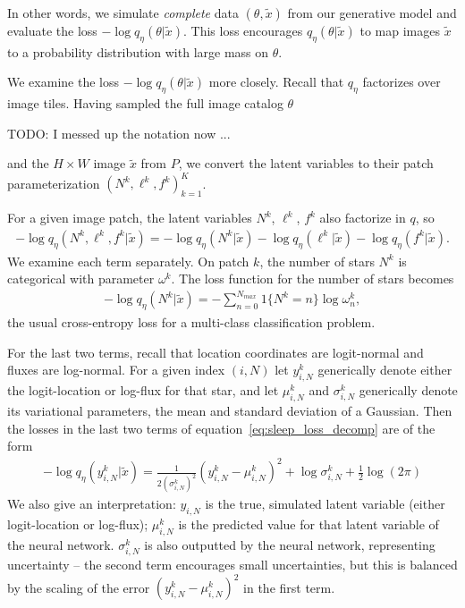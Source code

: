 In other words, we simulate {\itshape complete} data $(\theta, \tilde x)$ from our generative model and evaluate the loss $-\log q_\eta(\theta | \tilde x)$. 
This loss encourages $q_{\eta}(\theta | \tilde x)$ to map images $\tilde x$ to a probability distribution with large mass on $\theta$.

We examine the loss $-\log q_\eta(\theta | \tilde x)$ more closely. Recall that $q_\eta$ factorizes over image tiles. Having sampled the full image catalog $\theta$ 

TODO: I messed up the notation now ... 

and the $H\times W$ image $\tilde x$ from $P$, we convert the latent variables to their patch parameterization $(N^k, \ell^k, f^k)_{k = 1}^K$. 

For a given image patch, the latent variables $N^k$, $\ell^k$, $f^k$ also factorize in $q$, so 
\begin{align}
    - \log q_\eta(N^k, \ell^k, f^k | \tilde x) = 
        - \log q_\eta(N^k | \tilde x) 
        - \log q_\eta(\ell^k | \tilde x) 
        - \log q_\eta(f^k | \tilde x). 
        \label{eq:sleep_loss_decomp}
\end{align}
We examine each term separately. On patch $k$, the number of stars $N^k$ is categorical with parameter $\omega^k$. The loss function for the number of stars becomes
\begin{align}
    - \log q_\eta(N^k | \tilde x) = -\sum_{n = 0}^{N_{max}} 1\{N^k = n\} \log \omega^k_n, 
\end{align}
the usual cross-entropy loss for a multi-class classification problem. 

For the last two terms, recall that location coordinates are logit-normal and fluxes are log-normal. For a given index $(i, N)$ let $y^k_{i,N}$ generically denote either the 
logit-location or log-flux for that star, 
and let $\mu^k_{i,N}$ and $\sigma^{k}_{i,N}$ generically denote its variational parameters,
the mean and standard deviation of a Gaussian. Then the losses in the last two terms of equation~\ref{eq:sleep_loss_decomp} are of the form 
\begin{align}
    -\log q_\eta(y^k_{i,N} | \tilde x) = 
        \frac{1}{2(\sigma^{k}_{i,N})^2}(y^k_{i,N} - \mu^k_{i,N})^2
         + \log\sigma^{k}_{i,N}
         + \frac{1}{2}\log(2\pi)
\end{align}
We also give an interpretation: $y_{i,N}$ is the true, simulated latent variable (either logit-location or log-flux); $\mu^k_{i,N}$ is the predicted value for that latent variable of the neural network. $\sigma^{k}_{i,N}$ is also outputted by the neural network, representing uncertainty -- the second term encourages small uncertainties, but this is 
balanced by the scaling of the error $(y^k_{i,N} - \mu^k_{i,N})^2$ in the first term. 

